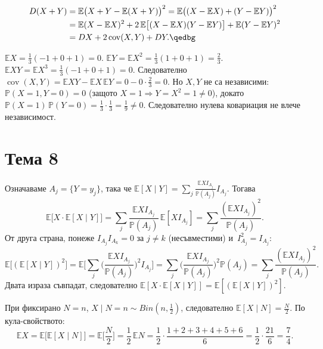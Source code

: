 \begin{proofbox}
\begin{align*}
  D(X+Y) &= \mathbb E\big(X+Y-\mathbb E(X+Y)\big)^2 = \mathbb E
  \big((X-\mathbb EX)+(Y-\mathbb EY)\big)^2\\
  &= \mathbb E(X-\mathbb EX)^2 + 2\,\mathbb E\big[(X-\mathbb EX)(Y-
  \mathbb EY)\big] + \mathbb E(Y-\mathbb EY)^2\\
  &= DX + 2\operatorname{cov}(X,Y) + DY. \qedbg
\end{align*}
\end{proofbox}

\begin{proofbox}
$\mathbb EX = \tfrac13(-1+0+1)=0$. $\mathbb EY=\mathbb EX^2=\tfrac13
(1+0+1)=\tfrac23$. $\mathbb EXY=\mathbb EX^3=\tfrac13(-1+0+1)=0$.
Следователно $\operatorname{cov}(X,Y)=\mathbb EXY-\mathbb EX\,
\mathbb EY = 0-0\cdot\tfrac23=0$. Но $X,Y$ не са независими: $\mathbb
P(X=1,Y=0)=0$ (защото $X=1\Rightarrow Y=X^2=1\ne0$), докато $\mathbb
P(X=1)\,\mathbb P(Y=0)=\tfrac13\cdot\tfrac13=\tfrac19\ne0$.
Следователно нулева ковариация не влече независимост. \qedbg
\end{proofbox}

\section*{Тема 8}

\begin{proofbox}
Означаваме $A_j=\{Y=y_j\}$, така че $\mathbb E[X\mid Y]=\sum_j
\frac{\mathbb EXI_{A_j}}{\mathbb P(A_j)}I_{A_j}$. Тогава
\[
  \mathbb E\big[X\cdot\mathbb E[X\mid Y]\big] = \sum_j\frac{\mathbb
  EXI_{A_j}}{\mathbb P(A_j)}\,\mathbb E[XI_{A_j}] = \sum_j\frac{
  (\mathbb EXI_{A_j})^2}{\mathbb P(A_j)}.
\]
От друга страна, понеже $I_{A_j}I_{A_k}=0$ за $j\ne k$ (несъвместими)
и~$I_{A_j}^2=I_{A_j}$:
\[
  \mathbb E\big[(\mathbb E[X\mid Y])^2\big] = \mathbb E\Big[\sum_j
  \Big(\frac{\mathbb EXI_{A_j}}{\mathbb P(A_j)}\Big)^2 I_{A_j}\Big] =
  \sum_j \Big(\frac{\mathbb EXI_{A_j}}{\mathbb P(A_j)}\Big)^2 \mathbb
  P(A_j) = \sum_j\frac{(\mathbb EXI_{A_j})^2}{\mathbb P(A_j)}.
\]
Двата израза съвпадат, следователно $\mathbb E[X\cdot\mathbb E[X\mid
Y]] = \mathbb E[(\mathbb E[X\mid Y])^2]$. \qedbg
\end{proofbox}

\begin{proofbox}
При фиксирано $N=n$, $X\mid N{=}n \sim Bin(n,\tfrac12)$, следователно
$\mathbb E[X\mid N]=\tfrac N2$. По кула-свойството:
\[
  \mathbb EX = \mathbb E\big[\mathbb E[X\mid N]\big] = \mathbb E
  \Big[\frac N2\Big] = \frac12\,\mathbb EN = \frac12\cdot\frac{1+2+
  3+4+5+6}6 = \frac12\cdot\frac{21}6 = \frac74.
\]
\end{proofbox}

